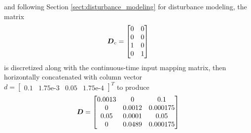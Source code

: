 and following Section \ref{sect:disturbance_modeling} for disturbance modeling, the matrix
\begin{equation*}
\begin{aligned}
    \vb*{D}_{c} = \begin{bmatrix}
        0 & 0\\
        0 & 0\\
        1 & 0\\
        0 & 1\\
    \end{bmatrix}
\end{aligned}
\end{equation*}
is discretized along with the continuous-time input mapping matrix, then horizontally concatenated with column vector $d = \begin{bmatrix} 0.1 & 1.75\text{e-}3 & 0.05 & 1.75\text{e-}4 \end{bmatrix}^{T}$ to produce
\begin{equation*}
\begin{aligned}
    \vb*{D} = \begin{bmatrix}
        0.0013 & 0 & 0.1\\
        0 & 0.0012 & 0.000175\\
        0.05 & 0.0001 & 0.05\\
        0 & 0.0489 & 0.000175\\
    \end{bmatrix}
\end{aligned}
\end{equation*}

